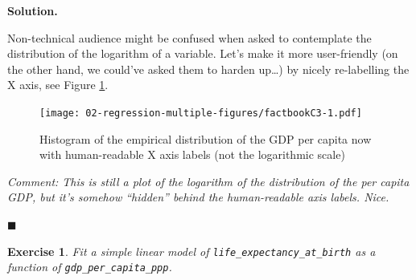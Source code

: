 \documentclass[10pt,b5paper,krantz1]{krantz}
\newenvironment{Shaded}{\begin{snugshade}}{\end{snugshade}}
\newcommand{\CommentTok}[1]{\textcolor[rgb]{0.37,0.37,0.37}{\textit{#1}}}
\newcommand{\DataTypeTok}[1]{\textcolor[rgb]{0.27,0.27,0.27}{#1}}
\newcommand{\DecValTok}[1]{\textcolor[rgb]{0.06,0.06,0.06}{#1}}
\newcommand{\KeywordTok}[1]{\textcolor[rgb]{0.27,0.27,0.27}{\textbf{#1}}}
\newcommand{\NormalTok}[1]{#1}
\newcommand{\OperatorTok}[1]{\textcolor[rgb]{0.43,0.43,0.43}{\textbf{#1}}}
\newcommand{\OtherTok}[1]{\textcolor[rgb]{0.37,0.37,0.37}{#1}}
\newcommand{\StringTok}[1]{\textcolor[rgb]{0.5,0.5,0.5}{#1}}
\newtheorem{exercise}{Exercise}[chapter]
\newenvironment{solution}{%
\bigskip\noindent\textbf{Solution. }%
\it\ignorespaces%
\ignorespaces%
}{\ignorespaces%
\hfill$\blacksquare$%
}
\begin{document}
\begin{solution}
Non-technical audience might be confused when asked to contemplate
the distribution of the logarithm of a variable. Let's make it
more user-friendly (on the other hand, we could've asked them
to harden up\ldots{})
by nicely re-labelling the X axis,
see Figure \ref{fig:factbookC3}.

\begin{Shaded}
\end{Shaded}

\begin{figure}
\hypertarget{fig:factbookC3}{%
\centering
\texttt{[image: 02-regression-multiple-figures/factbookC3-1.pdf]}
\caption{Histogram of the empirical distribution of the GDP per capita now with human-readable X axis labels (not the logarithmic scale)}\label{fig:factbookC3}
}
\end{figure}

\emph{Comment: This is still a plot of the logarithm of the
distribution of the per capita GDP, but it's somehow ``hidden'' behind
the human-readable axis labels. Nice.}

\end{solution}

\begin{exercise}

Fit a simple linear model of \texttt{life\_expectancy\_at\_birth}
as a function of \texttt{gdp\_per\_capita\_ppp}.

\end{exercise}
\end{document}
